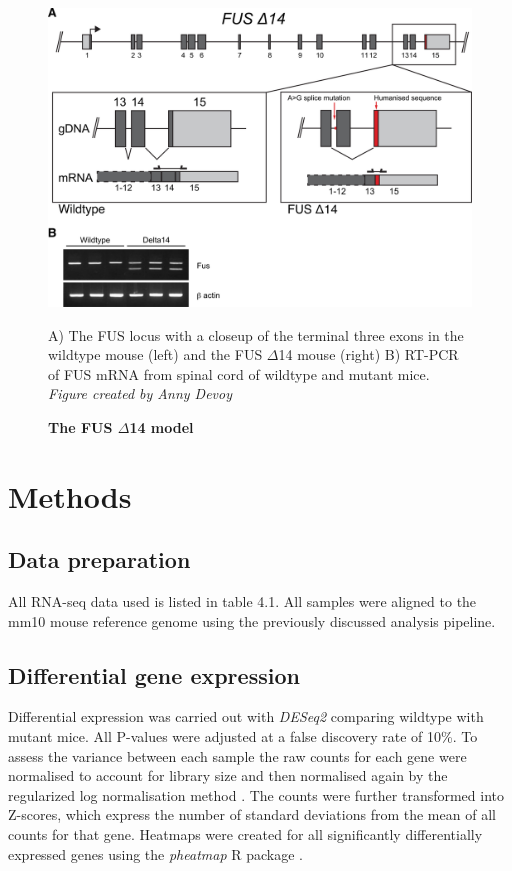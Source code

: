 \begin{figure}[h!]
	\begin{center}
		\includegraphics[width=\textwidth]{Figures/04_fus_mice/anny_FUS_schematic.png}
	\end{center}
	\caption{\textbf{The FUS $\Delta$14 model} }
		A) The FUS locus with a closeup of the terminal three exons in the wildtype mouse (left) and the FUS $\Delta$14 mouse (right) B) RT-PCR of FUS mRNA from spinal cord of wildtype and mutant mice. \textit{Figure created by Anny Devoy}
			\label{fig:delta14_structure}
\end{figure}


\section{Methods}

\subsection{Data preparation}
All RNA-seq data used is listed in table 4.1. All samples were aligned to the mm10 mouse reference genome using the previously discussed analysis pipeline.

\subsection{Differential gene expression}
Differential expression was carried out with \textit{DESeq2} \citep{Love2014} comparing wildtype with mutant mice. All P-values were adjusted at a false discovery rate of 10\%. To assess the variance between each sample the raw counts for each gene were normalised to account for library size and then normalised again by the regularized log normalisation method \citep{Love2014}. The counts were further transformed into Z-scores, which express the number of standard deviations from the mean of all counts for that gene. Heatmaps were created for all significantly differentially expressed genes using the \textit{pheatmap} R package \citep{Kolde2012}.  

